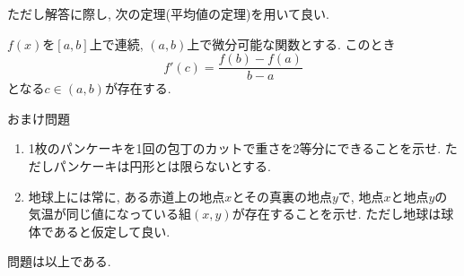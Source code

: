 \documentclass[dvipdfmx,a4paper,11pt]{article}
\theoremstyle{definition}
\begin{document}
ただし解答に際し, 次の定理(平均値の定理)を用いて良い.

\begin{tcolorbox}[
    colback = white,
    colframe = black,
    fonttitle = \bfseries,
    breakable = true]
 [定理] $f(x)$を$[a,b]$上で連続, $(a,b)$上で微分可能な関数とする.
このとき
$$
f'(c) = \frac{f(b)-f(a)}{b-a}
$$
となる$c \in (a,b)$が存在する. 
\end{tcolorbox}

 
  \vspace{11pt}
  {\Large おまけ問題}  
  \begin{enumerate}
 \item 1枚のパンケーキを1回の包丁のカットで重さを2等分にできることを示せ. ただしパンケーキは円形とは限らないとする. 
  \item 地球上には常に, ある赤道上の地点$x$とその真裏の地点$y$で, 地点$x$と地点$y$の気温が同じ値になっている組$(x,y)$が存在することを示せ. ただし地球は球体であると仮定して良い.
  \end{enumerate}


\begin{flushright}
\LARGE{問題は以上である. }
\end{flushright}
 
\end{document}
